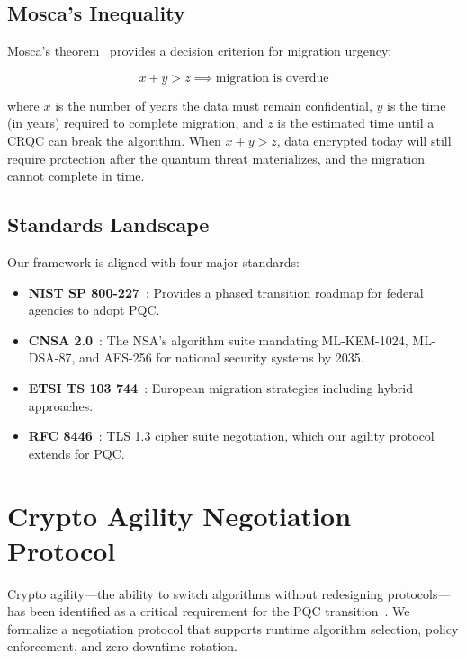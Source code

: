 \documentclass[conference,10pt]{IEEEtran}
\begin{document}
\subsection{Mosca's Inequality}

Mosca's theorem~\cite{mosca2018} provides a decision criterion for
migration urgency:

\begin{equation}\label{eq:mosca}
  x + y > z \implies \text{migration is overdue}
\end{equation}

\noindent where $x$ is the number of years the data must remain
confidential, $y$ is the time (in years) required to complete migration,
and $z$ is the estimated time until a CRQC can break the algorithm. When
$x + y > z$, data encrypted today will still require protection after the
quantum threat materializes, and the migration cannot complete in time.

\subsection{Standards Landscape}

Our framework is aligned with four major standards:

\begin{itemize}[leftmargin=*]
\item \textbf{NIST SP 800-227}~\cite{nist-sp800-227}: Provides a
  phased transition roadmap for federal agencies to adopt PQC.
\item \textbf{CNSA 2.0}~\cite{cnsa2}: The NSA's algorithm suite
  mandating ML-KEM-1024, ML-DSA-87, and AES-256 for national security
  systems by 2035.
\item \textbf{ETSI TS 103 744}~\cite{etsi-ts103744}: European
  migration strategies including hybrid approaches.
\item \textbf{RFC 8446}~\cite{rfc8446}: TLS 1.3 cipher suite
  negotiation, which our agility protocol extends for PQC.
\end{itemize}

\section{Crypto Agility Negotiation Protocol}\label{sec:agility}

Crypto agility---the ability to switch algorithms without redesigning
protocols---has been identified as a critical requirement for the PQC
transition~\cite{ott2019, housley2024, dhs-pqc-roadmap}. We formalize a
negotiation protocol that supports runtime algorithm selection, policy
enforcement, and zero-downtime rotation.
\end{document}

